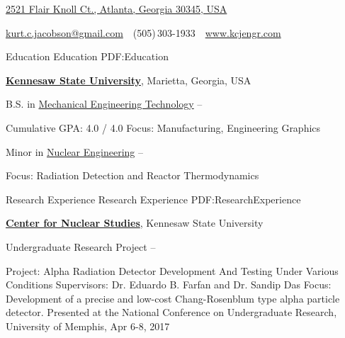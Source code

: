 \documentclass[letterpaper,MMMyyyy,nonstopmode]{resume}
\newcommand{\CVAuthor}{Kurt C. Jacobson}
\newcommand{\CVWebpage}{www.kcjengr.com}
\begin{document}

\Title{\CVAuthor}

\begin{SubTitle}
\href{https://www.google.com/maps/place/2521+Flair+Knoll+Ct+NE,+Atlanta,+GA+30345}
{2521 Flair Knoll Ct., Atlanta, Georgia 30345, USA}
\par
\href{mailto:kurtcjacobson@gmail.com}
{kurt.c.jacobson@gmail.com}
\,\SubBulletSymbol\,
(505)\,303-1933
\,\SubBulletSymbol\,
\href{\CVWebpage}
{\url{\CVWebpage}}
\end{SubTitle}

\begin{Body}


\Section
{Education}
{Education}
{PDF:Education}

\Entry
\href{http://www.kennesaw.edu/}
{\textbf{Kennesaw State University}},
Marietta, Georgia, USA

\Gap
\BulletItem
B.S. in
\href{http://engineering.kennesaw.edu/engineering-technology/}
{Mechanical Engineering Technology}
\hfill
{} --
\begin{Detail}
\SubBulletItem
Cumulative GPA: 4.0 / 4.0
\SubBulletItem
Focus:
Manufacturing, Engineering Graphics
\end{Detail}

\Gap
\BulletItem
Minor in
\href{http://engineering.kennesaw.edu/nuclear-studies/}
{Nuclear Engineering}
\hfill
{} --
\begin{Detail}
\SubBulletItem
Focus:
Radiation Detection and Reactor Thermodynamics
\end{Detail}


\Section
{Research Experience}
{Research Experience}
{PDF:ResearchExperience}

\Entry
\href{http://engineering.kennesaw.edu/nuclear-studies/}
{\textbf{Center for Nuclear Studies}},
Kennesaw State University

\Gap
\BulletItem
Undergraduate Research Project
\hfill
{} --
\begin{Detail}
\SubBulletItem
Project:
Alpha Radiation Detector Development And Testing Under Various Conditions
\SubBulletItem
Supervisors:
Dr. Eduardo B. Farfan and
Dr. Sandip Das
\SubBulletItem
Focus:
Development of a precise and low-cost Chang-Rosenblum type alpha particle detector.
\SubBulletItem
Presented at the National Conference on Undergraduate Research, University of Memphis, Apr 6-8, 2017
\end{Detail}



\end{Body}
\end{document}
